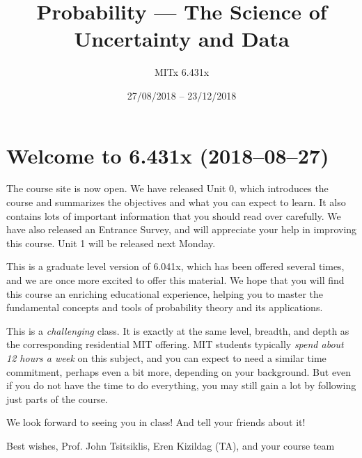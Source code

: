 \documentclass[pdftex, brazil, 12pt, twoside]{article}
\begin{document}
\title{Probability --- The Science of Uncertainty and Data}
\author{MITx 6.431x}
\date{27/08/2018 -- 23/12/2018}
\maketitle
\tableofcontents
\newpage




\section{Welcome to 6.431x (2018--08--27)}
\label{welcome}

The course site is now open. We have released Unit 0, which introduces the course
and summarizes the objectives and what you can expect to learn. It also contains
lots of important information that you should read over carefully. We have also
released an Entrance Survey, and will appreciate your help in improving this course.
Unit 1 will be released next Monday.

This is a graduate level version of 6.041x, which has been offered several times,
and we are once more excited to offer this material. We hope that you will find
this course an enriching educational experience, helping you to master the fundamental
concepts and tools of probability theory and its applications.

This is a \emph{challenging} class. It is exactly at the same level, breadth, and
depth as the corresponding residential MIT offering. MIT students typically \emph{spend
  about 12 hours a week} on this subject, and you can expect to need a similar time
commitment, perhaps even a bit more, depending on your background. But even if you
do not have the time to do everything, you may still gain a lot by following just
parts of the course.

We look forward to seeing you in class! And tell your friends about it!

Best wishes,
Prof. John Tsitsiklis, Eren Kizildag (TA), and your course team




\end{document}
